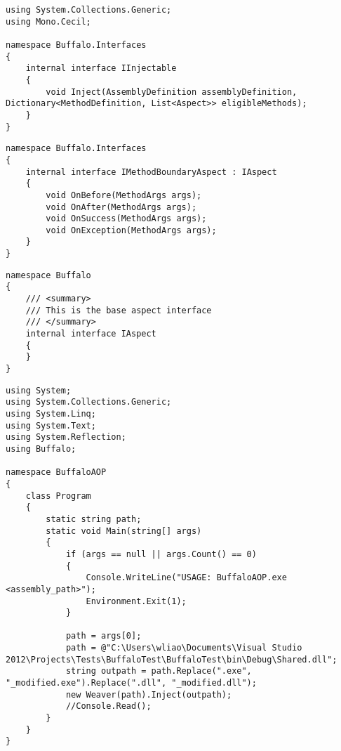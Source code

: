 \begin{lstlisting}[caption={../buffalo/Interfaces/IInjectable.cs}, label=../buffalo/Interfaces/IInjectable.cs, frame=tb, basicstyle=\scriptsize]﻿using System.Collections.Generic;
using Mono.Cecil;

namespace Buffalo.Interfaces
{
    internal interface IInjectable
    {
        void Inject(AssemblyDefinition assemblyDefinition, Dictionary<MethodDefinition, List<Aspect>> eligibleMethods);
    }
}
\end{lstlisting}

\begin{lstlisting}[caption={../buffalo/Interfaces/IMethodBoundaryAspect.cs}, label=../buffalo/Interfaces/IMethodBoundaryAspect.cs, frame=tb, basicstyle=\scriptsize]﻿namespace Buffalo.Interfaces
{
    internal interface IMethodBoundaryAspect : IAspect
    {
        void OnBefore(MethodArgs args);
        void OnAfter(MethodArgs args);
        void OnSuccess(MethodArgs args);
        void OnException(MethodArgs args);
    }
}
\end{lstlisting}

\begin{lstlisting}[caption={../buffalo/Interfaces/IAspect.cs}, label=../buffalo/Interfaces/IAspect.cs, frame=tb, basicstyle=\scriptsize]﻿namespace Buffalo
{
    /// <summary>
    /// This is the base aspect interface
    /// </summary>
    internal interface IAspect
    {
    }
}
\end{lstlisting}

\begin{lstlisting}[caption={../../buffalo/BuffaloAOP/Program.cs}, label=../../buffalo/BuffaloAOP/Program.cs, frame=tb, basicstyle=\scriptsize]﻿using System;
using System.Collections.Generic;
using System.Linq;
using System.Text;
using System.Reflection;
using Buffalo;

namespace BuffaloAOP
{
    class Program
    {
        static string path;
        static void Main(string[] args)
        {
            if (args == null || args.Count() == 0)
            {
                Console.WriteLine("USAGE: BuffaloAOP.exe <assembly_path>");
                Environment.Exit(1);
            }

            path = args[0];
            path = @"C:\Users\wliao\Documents\Visual Studio 2012\Projects\Tests\BuffaloTest\BuffaloTest\bin\Debug\Shared.dll";
            string outpath = path.Replace(".exe", "_modified.exe").Replace(".dll", "_modified.dll");
            new Weaver(path).Inject(outpath);
            //Console.Read();
        }
    }
}
\end{lstlisting}

